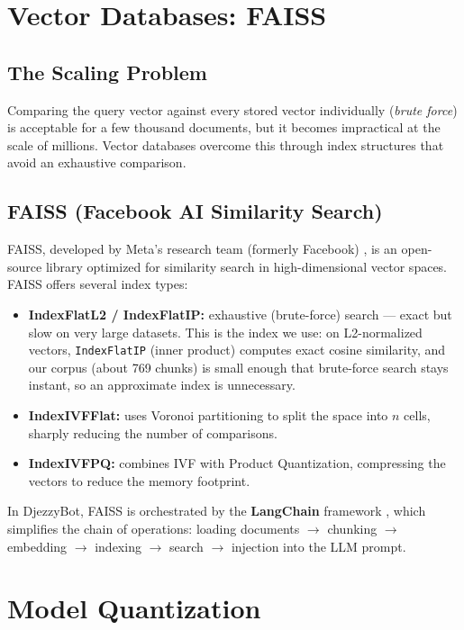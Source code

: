 \documentclass[12pt, a4paper]{report}
\newcommand{\sourced}[1]{#1}        %
\newcommand{\aitext}[1]{#1}         %
\newcommand{\humantext}[1]{#1}      %
\newcommand{\numChunks}{769}\newcommand{\numRoutes}{7}\newcommand{\numRules}{11}
\begin{document}
\section{Vector Databases: FAISS}
\label{sec:faiss}

\subsection{The Scaling Problem}
\humantext{Comparing the query vector against every stored vector individually (\textit{brute force}) is acceptable for a few thousand documents, but it becomes impractical at the scale of millions. Vector databases overcome this through index structures that avoid an exhaustive comparison.}

\subsection{FAISS (Facebook AI Similarity Search)}
\sourced{FAISS, developed by Meta's research team (formerly Facebook) \cite{johnson2019faiss}, is an open-source library optimized for similarity search in high-dimensional vector spaces. FAISS offers several index types:}

\begin{itemize}
    \item \humantext{\textbf{IndexFlatL2 / IndexFlatIP:} exhaustive (brute-force) search --- exact but slow on very large datasets. This is the index we use: on L2-normalized vectors, \texttt{IndexFlatIP} (inner product) computes exact cosine similarity, and our corpus (about \numChunks{} chunks) is small enough that brute-force search stays instant, so an approximate index is unnecessary.}
    \item \aitext{\textbf{IndexIVFFlat:} uses Voronoi partitioning to split the space into $n$ cells, sharply reducing the number of comparisons.}
    \item \aitext{\textbf{IndexIVFPQ:} combines IVF with Product Quantization, compressing the vectors to reduce the memory footprint.}
\end{itemize}

\humantext{In DjezzyBot, FAISS is orchestrated by the \textbf{LangChain} framework \cite{chase2022langchain}, which simplifies the chain of operations: loading documents $\rightarrow$ chunking $\rightarrow$ embedding $\rightarrow$ indexing $\rightarrow$ search $\rightarrow$ injection into the LLM prompt.}

\section{Model Quantization}
\end{document}
